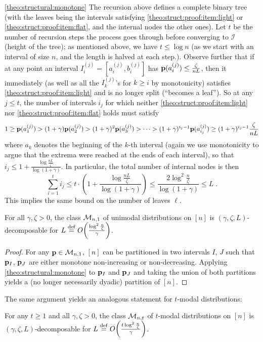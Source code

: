 \begin{proofof}{\cref{theo:structural:monotone}}
The recursion above defines a complete binary tree (with the leaves being the intervals satisfying \ref{theo:struct:proof:item:light} or \ref{theo:struct:proof:item:flat}, and the internal nodes the other ones). Let $t$ be the number of recursion steps the process goes through before converging to $\mathcal{I}$ (height of the tree); as mentioned above, we have $t\leq \log n$ (as we start with an interval of size $n$, and the length is halved at each step.). Observe further that if at any point an interval $I^{(j)}_i=[a^{(j)}_i, b^{(j)}_i]$ has $\mathbf{p}(a^{(j)}_i) \leq \frac{\zeta}{nL}$, then it immediately (as well as all the $I^{(j)}_k$'s for $k\geq i$ by monotonicity) satisfies \ref{theo:struct:proof:item:light} and is no longer split (``becomes a leaf''). So at any $j \leq t$, the number of intervals $i_j$ for which neither \ref{theo:struct:proof:item:light} nor \ref{theo:struct:proof:item:flat} holds must satisfy
\[
  1 \geq \mathbf{p}(a^{(j)}_1) > (1+\gamma)\mathbf{p}(a^{(j)}_2) > (1+\gamma)^2\mathbf{p}(a^{(j)}_3) > \dots > (1+\gamma)^{i_j-1}\mathbf{p}(a^{(j)}_{i_j}) \geq (1+\gamma)^{i_j-1}\frac{\zeta}{nL}
\]
where $a_k$ denotes the beginning of the $k$-th interval (again we use monotonicity to argue that the extrema were reached at the ends of each interval), so that $i_j \leq 1+\frac{\log\frac{nL}{\zeta}}{\log(1+\gamma)}$. In particular, the total number of internal nodes is then 
\[
\sum_{i=1}^t i_j \leq t\cdot\left(1+\frac{\log\frac{nL}{\zeta}}{\log(1+\gamma)}\right) \leq \frac{2\log^2 \frac{n}{\zeta}}{\log(1+\gamma)} \leq L\;.\]
This implies the same bound on the number of leaves $\ell$.
\end{proofof}

\begin{corollary}[Unimodality]\label{theo:structural:unimodal}
For all $\gamma,\zeta > 0$, the class $\mathcal{M}_{n,1}$ of unimodal distributions on $[n]$ is $(\gamma,\zeta,L)$-decomposable for $L \eqdef \bigO{\frac{\log^2 \frac{n}{\zeta}}{\gamma}}$.
\end{corollary}
\begin{proof}
For any $\mathbf{p}\in\mathcal{M}_{n,1}$, $[n]$ can be partitioned in two intervals $I$, $J$ such that $\mathbf{p}_{I}$, $\mathbf{p}_J$ are either monotone non-increasing or non-decreasing. Applying \cref{theo:structural:monotone} to $\mathbf{p}_{I}$ and $\mathbf{p}_J$ and taking the union of both partitions yields a (no longer necessarily dyadic) partition of $[n]$.
\end{proof}
\noindent The same argument yields an analogous statement for $t$-modal distributions:
\begin{corollary}[$t$-modality]\label{theo:structural:tmodal}
For any $t\geq 1$ and all $\gamma,\zeta > 0$, the class $\mathcal{M}_{n,t}$ of $t$-modal distributions on $[n]$ is $(\gamma,\zeta,L)$-decomposable for $L \eqdef \bigO{\frac{t\log^2 \frac{n}{\zeta}}{\gamma}}$.
\end{corollary}

